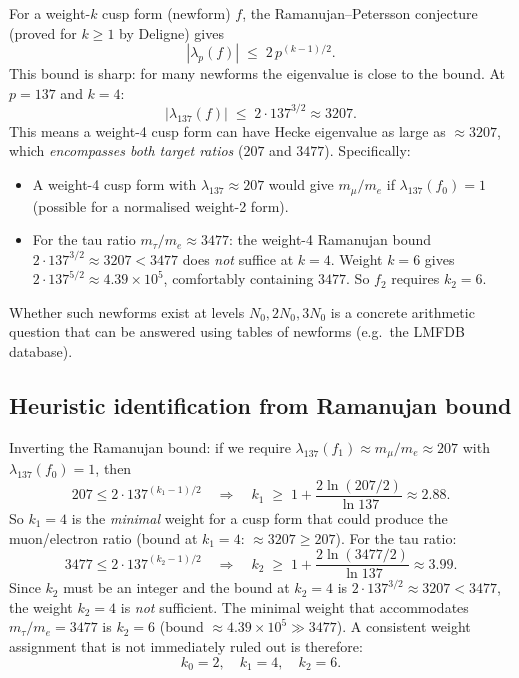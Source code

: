 \documentclass[12pt,a4paper]{article}
\theoremstyle{remark}
\begin{document}
For a weight-$k$ cusp form (newform) $f$, the Ramanujan--Petersson conjecture
(proved for $k\geq 1$ by Deligne) gives
\begin{equation}
  \label{eq:ramanujan}
  |\lambda_p(f)| \;\leq\; 2\,p^{(k-1)/2}.
\end{equation}
This bound is sharp: for many newforms the eigenvalue is close to the bound.
At $p=137$ and $k=4$:
\begin{equation}
  |\lambda_{137}(f)| \;\leq\; 2 \cdot 137^{3/2} \approx 3207.
\end{equation}
This means a weight-4 cusp form can have Hecke eigenvalue as large as
$\approx 3207$, which \emph{encompasses both target ratios} ($207$ and $3477$).
Specifically:
\begin{itemize}
  \item A weight-4 cusp form with $\lambda_{137} \approx 207$ would give
        $m_\mu/m_e$ if $\lambda_{137}(f_0)=1$ (possible for a normalised
        weight-2 form).
  \item For the tau ratio $m_\tau/m_e \approx 3477$: the weight-4 Ramanujan
        bound $2\cdot 137^{3/2}\approx 3207 < 3477$ does \emph{not} suffice at
        $k=4$.  Weight $k=6$ gives $2\cdot 137^{5/2}\approx 4.39\times 10^5$,
        comfortably containing $3477$.  So $f_2$ requires $k_2=6$.
\end{itemize}
Whether such newforms exist at levels $N_0, 2N_0, 3N_0$ is a concrete
arithmetic question that can be answered using tables of newforms
(e.g.\ the LMFDB database).

\subsection{Heuristic identification from Ramanujan bound}

Inverting the Ramanujan bound: if we require
$\lambda_{137}(f_1) \approx m_\mu/m_e \approx 207$ with $\lambda_{137}(f_0) = 1$,
then
\begin{equation}
  \label{eq:invert_ramanujan}
  207 \leq 2\cdot 137^{(k_1-1)/2}
  \quad\Longrightarrow\quad
  k_1 \;\geq\; 1 + \frac{2\ln(207/2)}{\ln 137}
  \approx 2.88.
\end{equation}
So $k_1 = 4$ is the \emph{minimal} weight for a cusp form that could
produce the muon/electron ratio (bound at $k_1=4$: $\approx 3207 \geq 207$).
For the tau ratio:
\begin{equation}
  \label{eq:invert_ramanujan_tau}
  3477 \leq 2\cdot 137^{(k_2-1)/2}
  \quad\Longrightarrow\quad
  k_2 \;\geq\; 1 + \frac{2\ln(3477/2)}{\ln 137}
  \approx 3.99.
\end{equation}
Since $k_2$ must be an integer and the bound at $k_2=4$ is
$2\cdot 137^{3/2}\approx 3207 < 3477$, the weight $k_2=4$ is \emph{not}
sufficient.  The minimal weight that accommodates $m_\tau/m_e=3477$ is
$k_2=6$ (bound $\approx 4.39\times 10^5 \gg 3477$).  A consistent
weight assignment that is not immediately ruled out is therefore:
\begin{equation}
  \label{eq:weight_assignment_B}
  k_0 = 2,\quad k_1 = 4,\quad k_2 = 6.
\end{equation}
\end{document}
